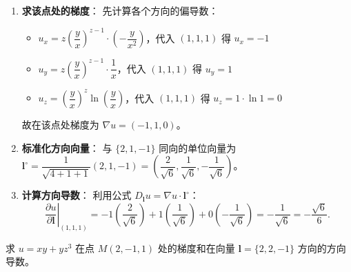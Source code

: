 \documentclass[lang=cn,11pt]{elegantbook}
\begin{document}
\begin{solution}
\begin{enumerate}
  \item \textbf{求该点处的梯度}：
  先计算各个方向的偏导数：
  \begin{itemize}
    \item $u_x = z\left(\dfrac{y}{x}\right)^{z-1} \cdot \left(-\dfrac{y}{x^2}\right)$，代入 $(1,1,1)$ 得 $u_x = -1$
    \item $u_y = z\left(\dfrac{y}{x}\right)^{z-1} \cdot \dfrac{1}{x}$，代入 $(1,1,1)$ 得 $u_y = 1$
    \item $u_z = \left(\dfrac{y}{x}\right)^z \ln\left(\dfrac{y}{x}\right)$，代入 $(1,1,1)$ 得 $u_z = 1 \cdot \ln 1 = 0$
  \end{itemize}
  故在该点处梯度为 $\nabla u = (-1, 1, 0)$。
  
  \item \textbf{标准化方向向量}：
  与 $\{2,1,-1\}$ 同向的单位向量为 $\boldsymbol l^\circ = \dfrac{1}{\sqrt{4+1+1}}(2, 1, -1) = \left(\dfrac{2}{\sqrt{6}}, \dfrac{1}{\sqrt{6}}, -\dfrac{1}{\sqrt{6}}\right)$。
  
  \item \textbf{计算方向导数}：
  利用公式 $D_{\boldsymbol l} u = \nabla u \cdot \boldsymbol l^\circ$：
  \[
  \left.\frac{\partial u}{\partial \boldsymbol l}\right|_{(1,1,1)} = -1\left(\frac{2}{\sqrt{6}}\right) + 1\left(\frac{1}{\sqrt{6}}\right) + 0\left(-\frac{1}{\sqrt{6}}\right) = -\frac{1}{\sqrt{6}} = -\frac{\sqrt{6}}{6}.
  \]
\end{enumerate}
\end{solution}



\begin{exercise}[梯度与方向导数的联合计算]
求 $u=xy+yz^3$ 在点 $M(2,-1,1)$ 处的梯度和在向量 $\boldsymbol l=\{2,2,-1\}$ 方向的方向导数。
\end{exercise}
\end{document}

